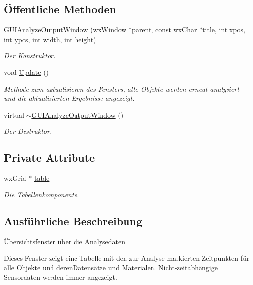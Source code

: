 \subsection*{Öffentliche Methoden}
\begin{DoxyCompactItemize}
\item 
\hyperlink{classGUIAnalyzeOutputWindow_af9407245a6b2a0478579c4d592a31e63}{G\-U\-I\-Analyze\-Output\-Window} (wx\-Window $\ast$parent, const wx\-Char $\ast$title, int xpos, int ypos, int width, int height)
\begin{DoxyCompactList}\small\item\em Der Konstruktor. \end{DoxyCompactList}\item 
void \hyperlink{classGUIAnalyzeOutputWindow_a9ea5a7cf46d6189f368315903508cecc}{Update} ()
\begin{DoxyCompactList}\small\item\em Methode zum aktualisieren des Fensters, alle Objekte werden erneut analysiert und die aktualisierten Ergebnisse angezeigt. \end{DoxyCompactList}\item 
virtual \hyperlink{classGUIAnalyzeOutputWindow_a8c5f2447557358ea724b68a89f363e37}{$\sim$\-G\-U\-I\-Analyze\-Output\-Window} ()
\begin{DoxyCompactList}\small\item\em Der Destruktor. \end{DoxyCompactList}\end{DoxyCompactItemize}
\subsection*{Private Attribute}
\begin{DoxyCompactItemize}
\item 
wx\-Grid $\ast$ \hyperlink{classGUIAnalyzeOutputWindow_afa1bc15fd767bfb9922e880403fb4305}{table}
\begin{DoxyCompactList}\small\item\em Die Tabellenkomponente. \end{DoxyCompactList}\end{DoxyCompactItemize}


\subsection{Ausführliche Beschreibung}
Übersichtsfenster über die Analysedaten. 

Dieses Fenster zeigt eine Tabelle mit den zur Analyse markierten Zeitpunkten für alle Objekte und deren\-Datensätze und Materialen. Nicht-\/zeitabhängige Sensordaten werden immer angezeigt. 

